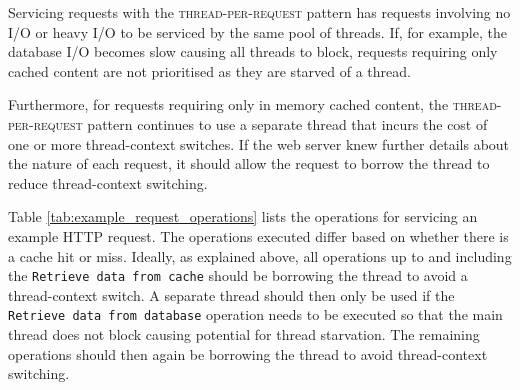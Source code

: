 \documentclass[prodmode]{style/acmlarge}
\begin{document}
Servicing requests with the \textsc{thread-per-request} pattern has requests
involving no I/O or heavy I/O to be serviced by the same pool of threads.  If,
for example, the database I/O becomes slow causing all threads to block,
requests requiring only cached content are not prioritised as they are starved
of a thread.

Furthermore, for requests requiring only in memory cached content, the
\textsc{thread-per-request} pattern continues to use a separate thread that
incurs the cost of one or more thread-context switches.  If the web server knew
further details about the nature of each request, it should allow the request to
borrow the thread to reduce thread-context switching.

Table \ref{tab:example_request_operations} lists the operations for servicing an
example HTTP request.  The operations executed differ based on whether there is
a cache hit or miss.  Ideally, as explained above, all operations up to and
including the \texttt{Retrieve data from cache} should be borrowing the thread
to avoid a thread-context switch.  A separate thread should then only be used if
the \texttt{Retrieve data from database} operation needs to be executed so that
the main thread does not block causing potential for thread starvation.  The
remaining operations should then again be borrowing the thread to avoid
thread-context switching.

\begin{table}[t]
\label{tab:example_request_operations}
\end{table}
\end{document}
